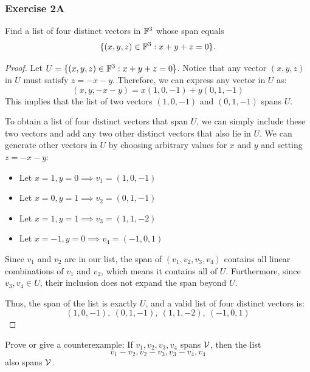 \subsubsection{Exercise 2A}
\begin{question}
	Find a list of four distinct vectors in $\mathbb{F}^3$ whose span equals
	\[
	\{(x, y, z) \in \mathbb{F}^3 : x + y + z = 0\}.
	\]
\end{question}
\begin{proof}
	Let $U = \{(x, y, z) \in \mathbb{F}^3 : x + y + z = 0\}$. Notice that any vector $(x, y, z)$ in $U$ must satisfy $z = -x - y$. Therefore, we can express any vector in $U$ as:
	\[
	(x, y, -x-y) = x(1, 0, -1) + y(0, 1, -1)
	\]
	This implies that the list of two vectors $(1, 0, -1)$ and $(0, 1, -1)$ spans $U$. 
	
	To obtain a list of four distinct vectors that span $U$, we can simply include these two vectors and add any two other distinct vectors that also lie in $U$. We can generate other vectors in $U$ by choosing arbitrary values for $x$ and $y$ and setting $z = -x - y$:
	\begin{itemize}
		\item Let $x=1, y=0 \implies v_1 = (1, 0, -1)$
		\item Let $x=0, y=1 \implies v_2 = (0, 1, -1)$
		\item Let $x=1, y=1 \implies v_3 = (1, 1, -2)$
		\item Let $x=-1, y=0 \implies v_4 = (-1, 0, 1)$
	\end{itemize}
	
	Since $v_1$ and $v_2$ are in our list, the span of $(v_1, v_2, v_3, v_4)$ contains all linear combinations of $v_1$ and $v_2$, which means it contains all of $U$. Furthermore, since $v_3, v_4 \in U$, their inclusion does not expand the span beyond $U$. 
	
	Thus, the span of the list is exactly $U$, and a valid list of four distinct vectors is:
	\[
	(1, 0, -1), \ (0, 1, -1), \ (1, 1, -2), \ (-1, 0, 1)
	\]
\end{proof}
\begin{question}
	Prove or give a counterexample: If $v_1, v_2, v_3, v_4$ spans $\mathcal{V}$, then the list
	\[
	v_1 - v_2, v_2 - v_3, v_3 - v_4, v_4
	\]
	also spans $\mathcal{V}$.
\end{question}
